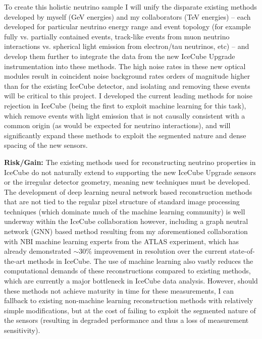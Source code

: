 \documentclass[a4paper,11pt]{article}
\begin{document}
To create this holistic neutrino sample I will unify the disparate existing methods developed by myself (GeV energies) and my collaborators (TeV energies) -- each developed for particular neutrino energy range and event topology (for example fully vs. partially contained events, track-like events from muon neutrino interactions vs. spherical light emission from electron/tau neutrinos, etc) -- and develop them further to integrate the data from the new IceCube Upgrade instrumentation into these methods. The high noise rates in these new optical modules result in coincident noise background rates orders of magnitude higher than for the existing IceCube detector, and isolating and removing these events will be critical to this project. I developed the current leading methods for noise rejection in IceCube (being the first to exploit machine learning for this task), which remove events with light emission that is not causally consistent with a common origin (as would be expected for neutrino interactions), and will significantly expand these methods to exploit the segmented nature and dense spacing of the new sensors.

\textbf{Risk/Gain:} The existing methods used for reconstructing neutrino properties in IceCube do not naturally extend to supporting the new IceCube Upgrade sensors or the irregular detector geometry, meaning new techniques must be developed. The development of deep learning neural network based reconstruction methods that are not tied to the regular pixel structure of standard image processing techniques (which dominate much of the machine learning community) is well underway within the IceCube collaboration however, including a graph neutral network (GNN) based method resulting from my aforementioned collaboration with NBI machine learning experts from the ATLAS experiment, which has already demonstrated $\sim$30\% improvement in resolution over the current state-of-the-art methods in IceCube. The use of machine learning also vastly reduces the computational demands of these reconstructions compared to existing methods, which are currently a major bottleneck in IceCube data analysis. However, should these methods not achieve maturity in time for these measurements, I can fallback to existing non-machine learning reconstruction methods with relatively simple modifications, but at the cost of failing to exploit the segmented nature of the sensors (resulting in degraded performance and thus a loss of measurement sensitivity). \\
\end{document}
